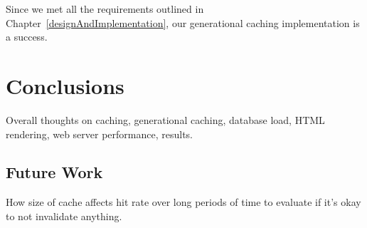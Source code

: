 \documentclass[12pt]{ucthesis}
\begin{document}
Since we met all the requirements outlined in Chapter~\ref{designAndImplementation}, our generational caching implementation is a success.


\chapter{Conclusions} \label{conclusions}
Overall thoughts on caching, generational caching, database load, HTML rendering, web server performance, results.

\section{Future Work}
How size of cache affects hit rate over long periods of time to evaluate if it's okay to not invalidate anything.



\clearpage


\end{document}
